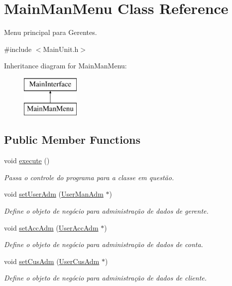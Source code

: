 \hypertarget{classMainManMenu}{\section{Main\-Man\-Menu Class Reference}
\label{d0/d1d/classMainManMenu}
}


Menu principal para Gerentes.  




{\ttfamily \#include $<$Main\-Unit.\-h$>$}

Inheritance diagram for Main\-Man\-Menu\-:\begin{figure}[H]
\begin{center}
\leavevmode
\includegraphics[height=2.000000cm]{d0/d1d/classMainManMenu}
\end{center}
\end{figure}
\subsection*{Public Member Functions}
\begin{DoxyCompactItemize}
\item 
void \hyperlink{classMainManMenu_ac864c18863c5f308d0b9c52c223b4b9c}{execute} ()
\begin{DoxyCompactList}\small\item\em Passa o controle do programa para a classe em questão. \end{DoxyCompactList}\item 
void \hyperlink{classMainManMenu_aa4174687e0614fd63783c39340dfc17e}{set\-User\-Adm} (\hyperlink{classUserManAdm}{User\-Man\-Adm} $\ast$)
\begin{DoxyCompactList}\small\item\em Define o objeto de negócio para administração de dados de gerente. \end{DoxyCompactList}\item 
void \hyperlink{classMainManMenu_a507ebea41371d58e137ece5a11bb63bf}{set\-Acc\-Adm} (\hyperlink{classUserAccAdm}{User\-Acc\-Adm} $\ast$)
\begin{DoxyCompactList}\small\item\em Define o objeto de negócio para administração de dados de conta. \end{DoxyCompactList}\item 
void \hyperlink{classMainManMenu_a94b488d911497cf9453e9277806d5241}{set\-Cus\-Adm} (\hyperlink{classUserCusAdm}{User\-Cus\-Adm} $\ast$)
\begin{DoxyCompactList}\small\item\em Define o objeto de negócio para administração de dados de cliente. \end{DoxyCompactList}\end{DoxyCompactItemize}


